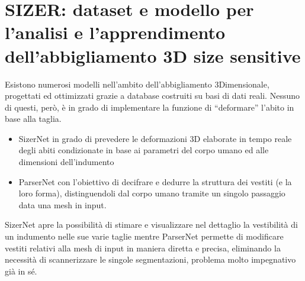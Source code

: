 \section{SIZER: dataset e modello per l’analisi e l'apprendimento dell’abbigliamento 3D size sensitive}

Esistono numerosi modelli nell’ambito dell’abbigliamento 3Dimensionale, progettati ed ottimizzati grazie a database costruiti su basi di dati reali.  
Nessuno di questi, però, è in grado di implementare la funzione di “deformare” l’abito in base alla taglia.

\medskip

\begin{itemize}
\item SizerNet in grado di prevedere le deformazioni 3D elaborate in tempo reale degli abiti condizionate in base ai parametri del corpo umano ed alle dimensioni dell’indumento 
\item ParserNet con l’obiettivo di decifrare e dedurre la struttura dei vestiti (e la loro forma), distinguendoli dal corpo umano tramite un singolo passaggio data una mesh in input.

\end{itemize}

\medskip

SizerNet apre la possibilità di stimare e visualizzare nel dettaglio la vestibilità di un indumento nelle sue varie taglie mentre ParserNet permette di modificare vestiti relativi alla mesh di input in maniera diretta e precisa, eliminando la necessità di scannerizzare le singole segmentazioni, problema molto impegnativo già in sé.

\medskip

